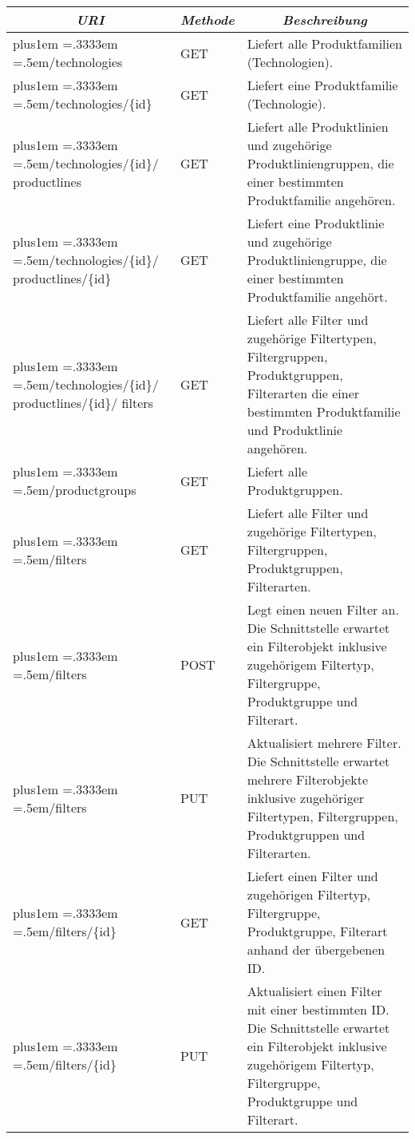 \begin{table}[H]
\centering
\def\rr{\rightskip=0pt plus1em \spaceskip=.3333em \xspaceskip=.5em\relax}
\setlength{\tabcolsep}{1ex}
\def\arraystretch{1.20}
\setlength{\tabcolsep}{1ex}
\small
\begin{tabular}{|p{}|p{}|p{}|}
\hline
   \multicolumn{1}{|c}{\emph{URI}} &
   \multicolumn{1}{|c}{\emph{Methode}} &
   \multicolumn{1}{|c|}{\emph{Beschreibung}} \\
\hline\hline
   {\rr /technologies} &
   GET &
Liefert alle Produktfamilien (Technologien).
   \\
\hline
   {\rr /technologies/\{id\}} &
   GET &
Liefert eine Produktfamilie (Technologie).
   \\
\hline
   {\rr /technologies/\{id\}/\break{}
   productlines} &
   GET &
Liefert alle Produktlinien und zugehörige Produktliniengruppen, die einer bestimmten Produktfamilie angehören.
   \\
\hline
   {\rr /technologies/\{id\}/\break{}
   productlines/\{id\}} &
   GET &
Liefert eine Produktlinie und zugehörige Produktliniengruppe, die einer bestimmten Produktfamilie angehört.
   \\
\hline
   {\rr /technologies/\{id\}/\break{}
   productlines/\{id\}/\break{}
   filters} &
   GET &
Liefert alle Filter und zugehörige Filtertypen, Filtergruppen, Produktgruppen, Filterarten die einer bestimmten Produktfamilie und Produktlinie angehören.
   \\
\hline
   {\rr /productgroups} &
   GET &
Liefert alle Produktgruppen.
   \\
\hline
   {\rr /filters} &
   GET &
Liefert alle Filter und zugehörige Filtertypen, Filtergruppen, Produktgruppen, Filterarten.
   \\
\hline
   {\rr /filters} &
   POST &
Legt einen neuen Filter an. Die Schnittstelle erwartet ein Filterobjekt inklusive zugehörigem Filtertyp, Filtergruppe, Produktgruppe und Filterart.
   \\
\hline
   {\rr /filters} &
   PUT &
Aktualisiert mehrere Filter. Die Schnittstelle erwartet mehrere Filterobjekte inklusive zugehöriger Filtertypen, Filtergruppen, Produktgruppen und Filterarten.
   \\
\hline
   {\rr /filters/\{id\}} &
   GET &
Liefert einen Filter und zugehörigen Filtertyp, Filtergruppe, Produktgruppe, Filterart anhand der übergebenen ID.
   \\
\hline
   {\rr /filters/\{id\}} &
   PUT &
Aktualisiert einen Filter mit einer bestimmten ID. Die Schnittstelle erwartet ein Filterobjekt inklusive zugehörigem Filtertyp, Filtergruppe, Produktgruppe und Filterart.

\end{tabular}
\end{table}
